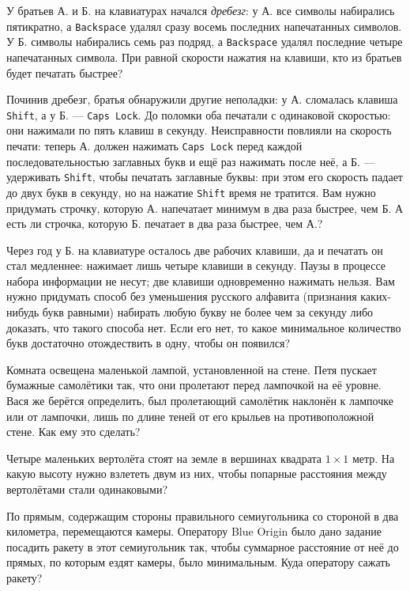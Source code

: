 \begin{itemize}
\itA У братьев А. и Б. на клавиатурах начался {\itshape дребезг}: у А. все символы набирались пятикратно, а {\tt Backspace} удалял сразу восемь последних напечатанных символов. У Б. символы набирались семь раз подряд, а {\tt Backspace} удалял последние четыре напечатанных символа. При равной скорости нажатия на клавиши, кто из братьев будет печатать быстрее?

\itB Починив дребезг, братья обнаружили другие неполадки: у А. сломалась клавиша {\tt Shift}, а у Б. — {\tt Caps Lock}. До поломки оба печатали с одинаковой скоростью: они нажимали по пять клавиш в секунду. Неисправности повлияли на скорость печати: теперь А. должен нажимать {\tt Caps Lock} перед каждой последовательностью заглавных букв и ещё раз нажимать после неё, а Б. — удерживать {\tt Shift}, чтобы печатать заглавные буквы: при этом его скорость падает до двух букв в секунду, но на нажатие {\tt Shift} время не тратится. Вам нужно придумать строчку, которую А. напечатает минимум в два раза быстрее, чем Б. А есть ли строчка, которую Б. печатает в два раза быстрее, чем А.?

\itC Через год у Б. на клавиатуре осталось две рабочих клавиши, да и печатать он стал медленнее: нажимает лишь четыре клавиши в секунду. Паузы в процессе набора информации не несут; две клавиши одновременно нажимать нельзя. Вам нужно придумать способ без уменьшения русского алфавита (признания каких-нибудь букв равными) набирать любую букву не более чем за секунду либо доказать, что такого способа нет. Если его нет, то какое минимальное количество букв достаточно отождествить в одну, чтобы он появился?
\end{itemize}

\begin{itemize}
\itA Комната освещена маленькой лампой, установленной на стене. Петя пускает бумажные самолётики так, что они пролетают перед лампочкой на её уровне. Вася же берётся определить, был пролетающий самолётик наклонён к лампочке или от лампочки, лишь по длине теней от его крыльев на противоположной стене. Как ему это сделать?

\itB Четыре маленьких вертолёта стоят на земле в вершинах квадрата $1 \times 1$ метр. На какую высоту нужно взлететь двум из них, чтобы попарные расстояния между вертолётами стали одинаковыми?

\itC По прямым, содержащим стороны правильного семиугольника со стороной в два километра, перемещаются камеры. Оператору Blue Origin было дано задание посадить ракету в этот семиугольник так, чтобы суммарное расстояние от неё до прямых, по которым ездят камеры, было минимальным. Куда оператору сажать ракету?
\end{itemize}

